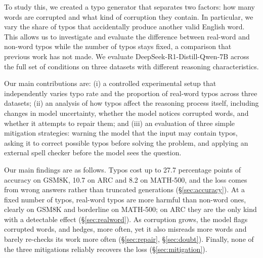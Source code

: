 \documentclass[11pt]{article}
\begin{document}
To study this, we created a typo generator that separates two factors: how many words are corrupted and what kind of corruption they contain. In particular, we vary the share of typos that accidentally produce another valid English word. This allows us to investigate and evaluate the difference between real-word and non-word typos while the number of typos stays fixed, a comparison that previous work has not made. We evaluate DeepSeek-R1-Distill-Qwen-7B \citep{guo2025} across the full set of conditions on three datasets with different reasoning characteristics.

Our main contributions are: (i) a controlled experimental setup that independently varies typo rate and the proportion of real-word typos across three datasets; (ii) an analysis of how typos affect the reasoning process itself, including changes in model uncertainty, whether the model notices corrupted words, and whether it attempts to repair them; and (iii) an evaluation of three simple mitigation strategies: warning the model that the input may contain typos, asking it to correct possible typos before solving the problem, and applying an external spell checker before the model sees the question.

Our main findings are as follows. Typos cost up to 27.7 percentage points of accuracy on GSM8K, 10.7 on ARC and 8.2 on MATH-500, and the loss comes from wrong answers rather than truncated generations (\S\ref{sec:accuracy}). At a fixed number of typos, real-word typos are more harmful than non-word ones, clearly on GSM8K and borderline on MATH-500; on ARC they are the only kind with a detectable effect (\S\ref{sec:realword}). As corruption grows, the model flags corrupted words, and hedges, more often, yet it also misreads more words and barely re-checks its work more often (\S\ref{sec:repair}, \S\ref{sec:doubt}). Finally, none of the three mitigations reliably recovers the loss (\S\ref{sec:mitigation}).
\end{document}
